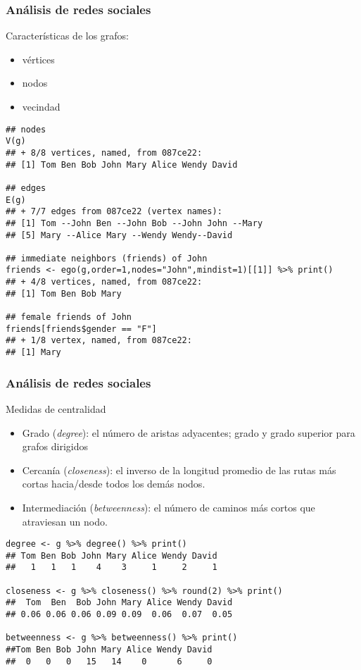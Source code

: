 \documentclass[11pt]{beamer}
\begin{document}
\begin{frame}[fragile]
\frametitle{Análisis de redes sociales} 
Características de los grafos:
\begin{itemize}
    \item vértices
    \item nodos
    \item vecindad 
\end{itemize}
    \begin{verbatim}
## nodes
V(g)
## + 8/8 vertices, named, from 087ce22:
## [1] Tom Ben Bob John Mary Alice Wendy David

## edges
E(g)
## + 7/7 edges from 087ce22 (vertex names):
## [1] Tom --John Ben --John Bob --John John --Mary
## [5] Mary --Alice Mary --Wendy Wendy--David

## immediate neighbors (friends) of John
friends <- ego(g,order=1,nodes="John",mindist=1)[[1]] %>% print()
## + 4/8 vertices, named, from 087ce22:
## [1] Tom Ben Bob Mary

## female friends of John
friends[friends$gender == "F"]
## + 1/8 vertex, named, from 087ce22:
## [1] Mary        
    \end{verbatim}
\end{frame}

\begin{frame}[fragile]
\frametitle{Análisis de redes sociales} 
Medidas de centralidad
\begin{itemize}   
\item Grado (\textit{degree}): el número de aristas adyacentes; grado y
grado superior para grafos dirigidos
\item Cercanía (\textit{closeness}): el inverso de la longitud promedio de las rutas más cortas hacia/desde todos los demás nodos.
\item Intermediación (\textit{betweenness}): el número de caminos más cortos que atraviesan un nodo.
\end{itemize}
    \begin{verbatim}
degree <- g %>% degree() %>% print()
## Tom Ben Bob John Mary Alice Wendy David
##   1   1   1    4    3     1     2     1

closeness <- g %>% closeness() %>% round(2) %>% print()
##  Tom  Ben  Bob John Mary Alice Wendy David
## 0.06 0.06 0.06 0.09 0.09  0.06  0.07  0.05

betweenness <- g %>% betweenness() %>% print()
##Tom Ben Bob John Mary Alice Wendy David
##  0   0   0   15   14    0      6     0     
    \end{verbatim}
\end{frame}
\end{document}
